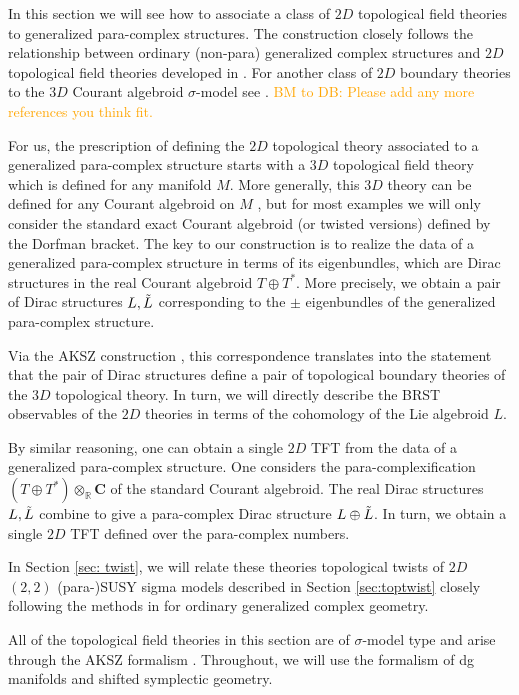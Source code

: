 \documentclass[letterpaper,12pt]{article}
\newcommand{\TT}{{T\oplus T^*}}
\newcommand{\Cc}{\mathbf{C}}
\newcommand{\RR}{\mathbb{R}}
\theoremstyle{definition}
\theoremstyle{remark}
\theoremstyle{examples}
\def\brian{\textcolor{blue}{BM: }\textcolor{blue}}
\def\btd{\textcolor{orange}{BM to DB: }\textcolor{orange}}
\begin{document}
\def\fg{\mathfrak{g}}

In this section we will see how to associate a class of $2D$ topological field theories to generalized para-complex structures.
The construction closely follows the relationship between ordinary (non-para) generalized complex structures \cite{Gualtieri:2003dx} and $2D$ topological field theories developed in \cite{Cattaneo:2009zx, Pestun:2006rj}.
For another class of $2D$ boundary theories to the $3D$ Courant algebroid $\sigma$-model see \cite{SeveraTduality}. \btd{Please add any more references you think fit.}

For us, the prescription of defining the $2D$ topological theory associated to a generalized para-complex structure starts with a $3D$ topological field theory which is defined for any manifold $M$. 
More generally, this $3D$ theory can be defined for any Courant algebroid on $M$ \cite{Roytenberg:2002nu}, but for most examples we will only consider the standard exact Courant algebroid (or twisted versions) defined by the Dorfman bracket.
The key to our construction is to realize the data of a generalized para-complex structure in terms of its eigenbundles, which are Dirac structures in the real Courant algebroid $\TT$.
More precisely, we obtain a pair of Dirac structures $L, \Tilde{L}$ corresponding to the $\pm$ eigenbundles of the generalized para-complex structure. 

Via the AKSZ construction \cite{AKSZ}, this correspondence translates into the statement that the pair of Dirac structures define a pair of topological boundary theories of the $3D$ topological theory.
In turn, we will directly describe the BRST observables of the $2D$ theories in terms of the cohomology of the Lie algebroid $L$. 

By similar reasoning, one can obtain a single $2D$ TFT from the data of a generalized para-complex structure. 
One considers the para-complexification $(\TT) \otimes_{\RR} \Cc$ of the standard Courant algebroid. 
The real Dirac structures $L, \Tilde{L}$ combine to give a para-complex Dirac structure $L \oplus \Tilde{L}$. 
In turn, we obtain a single $2D$ TFT defined over the para-complex numbers.

In Section \ref{sec: twist}, we will relate these theories topological twists of $2D$ $(2,2)$ (para-)SUSY sigma models described in Section \ref{sec:toptwist} closely following the methods in \cite{Kapustin:2004gv} for ordinary generalized complex geometry.

All of the topological field theories in this section are of $\sigma$-model type and arise through the AKSZ formalism \cite{AKSZ}. 
Throughout, we will use the formalism of dg manifolds and shifted symplectic geometry. 
\end{document}
